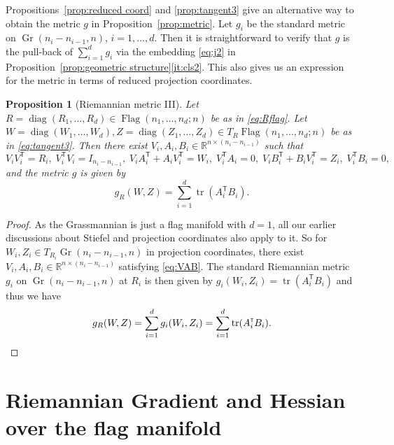 \documentclass[11pt,reqno]{amsart}%
\newtheorem{proposition}[theorem]{Proposition}
\theoremstyle{definition}
\theoremstyle{remark}
\newcommand{\tp}{{\scriptscriptstyle\mathsf{T}}}
\DeclareMathOperator{\Gr}{Gr}
\DeclareMathOperator{\Flag}{Flag}
\DeclareMathOperator{\tr}{tr}
\DeclareMathOperator{\diag}{diag}
\begin{document}
Propositions~\ref{prop:reduced coord} and \ref{prop:tangent3} give an alternative way to obtain the metric  $g$ in Proposition~\ref{prop:metric}. Let $g_i$ be the standard metric on $\Gr(n_i-n_{i-1},n)$, $i=1,\dots,d$. Then it is straightforward to verify that $g$ is the pull-back of $\sum_{i=1}^d g_i$ via the embedding  \eqref{eq:j2} in Proposition~\ref{prop:geometric structure}\eqref{it:cls2}. This also gives us an expression for the metric in terms of reduced projection coordinates.
\begin{proposition}[Riemannian metric III]\label{prop:metric3}
Let $R = \diag(R_1,\dots, R_d) \in \Flag(n_1,\dots,n_d;n)$ be as in \eqref{eq:Rflag}.
Let $W= \diag(W_1,\dots,W_d),Z =\diag(Z_1,\dots,Z_d)\in T_R \Flag(n_1,\dots, n_d;n)$ be as in \eqref{eq:tangent3}. Then there exist $V_i, A_i, B_i\in \mathbb{R}^{n\times (n_i - n_{i-1})}$ such that
\begin{equation}\label{eq:VAB}
V_i V_i^\tp = R_i,\; V_i^\tp V_i = I_{n_i - n_{i-1}}, \;
V_i A_i^\tp + A_i V_i^\tp = W_i,\;
V_i^\tp A_i = 0,\;
V_i B_i^\tp + B_i V_i^\tp = Z_i,\;
V_i^\tp B_i = 0,
\end{equation}
and the metric $g$  is given by 
\[
g_R(W,Z) =  \sum_{i=1}^d   \tr(A_i^\tp B_i).
\]
\end{proposition}
\begin{proof}
As the Grassmannian is just a flag manifold with $d=1$, all our earlier discussions about Stiefel and projection coordinates also apply to it. So for $W_i,Z_i \in T_{R_i} \Gr(n_i-n_{i-1},n)$ in projection coordinates, there exist $V_i, A_i, B_i\in \mathbb{R}^{n\times (n_i - n_{i-1})}$ satisfying \eqref{eq:VAB}.
The standard Riemannian metric $g_i$ on $\Gr(n_i-n_{i-1},n)$ at $R_i$ is then  given by $g_i (W_i,Z_i) =  \tr( A_i^\tp B_i)$ and thus we have 
\[
g_R(W,Z) = \sum_{i=1}^d g_i (W_i,Z_i) = \sum_{i=1}^d   \tr(A_i^\tp B_i). \qedhere
\]
\end{proof}

\section{Riemannian Gradient and Hessian over the flag manifold}\label{sec:gH}
\end{document}
